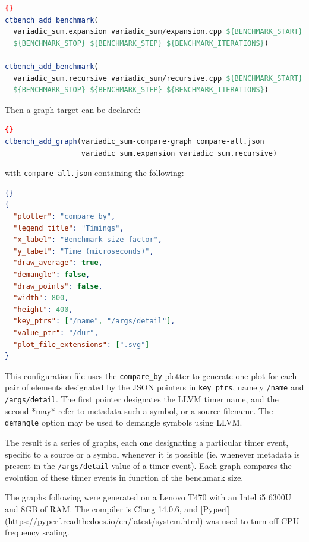 \documentclass[../../main.tex]{subfiles}
\begin{document}
\begin{lstlisting}[language=CMake]{}
ctbench_add_benchmark(
  variadic_sum.expansion variadic_sum/expansion.cpp ${BENCHMARK_START}
  ${BENCHMARK_STOP} ${BENCHMARK_STEP} ${BENCHMARK_ITERATIONS})

ctbench_add_benchmark(
  variadic_sum.recursive variadic_sum/recursive.cpp ${BENCHMARK_START}
  ${BENCHMARK_STOP} ${BENCHMARK_STEP} ${BENCHMARK_ITERATIONS})
\end{lstlisting}

Then a graph target can be declared:

\begin{lstlisting}[language=CMake]{}
ctbench_add_graph(variadic_sum-compare-graph compare-all.json
                  variadic_sum.expansion variadic_sum.recursive)
\end{lstlisting}

with \lstinline{compare-all.json} containing the following:

\begin{lstlisting}[language=JSON]{}
{
  "plotter": "compare_by",
  "legend_title": "Timings",
  "x_label": "Benchmark size factor",
  "y_label": "Time (microseconds)",
  "draw_average": true,
  "demangle": false,
  "draw_points": false,
  "width": 800,
  "height": 400,
  "key_ptrs": ["/name", "/args/detail"],
  "value_ptr": "/dur",
  "plot_file_extensions": [".svg"]
}
\end{lstlisting}

This configuration file uses the \lstinline{compare_by} plotter to generate one plot for
each pair of elements designated by the JSON pointers in \lstinline{key_ptrs}, namely
\lstinline{/name} and \lstinline{/args/detail}. The first pointer designates the LLVM timer name,
and the second *may* refer to metadata such a \cpp symbol, or a \cpp source
filename. The \lstinline{demangle} option may be used to demangle \cpp symbols using LLVM.

The result is a series of graphs, each one designating a particular timer event,
specific to a source or a symbol whenever it is possible (ie. whenever metadata
is present in the \lstinline{/args/detail} value of a timer event). Each graph compares
the evolution of these timer events in function of the benchmark size.

The graphs following were generated on a Lenovo T470 with an Intel i5 6300U and
8GB of RAM. The compiler is Clang
14.0.6, and [Pyperf](https://pyperf.readthedocs.io/en/latest/system.html) was
used to turn off CPU frequency scaling.
\end{document}

